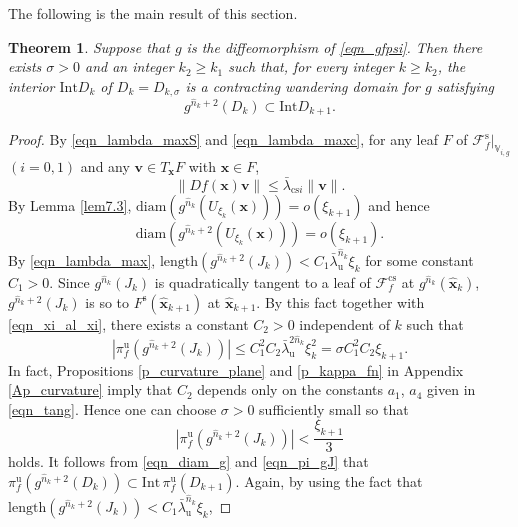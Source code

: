 \documentclass{amsart}
\newtheorem{thm}{Theorem}[section]
\theoremstyle{definition}
\numberwithin{equation}{section}
\numberwithin{figure}{section}
\begin{document}
The following is the main result of this section.


\begin{thm}\label{thmWD}
Suppose that $g$ is the diffeomorphism of \eqref{eqn_gfpsi}.
Then there exists $\sigma>0$ and an integer $k_2\geq k_1$ such that, 
for every integer $k\geq k_2$, the interior $\mathrm{Int}D_k$ of 
$D_k=D_{k,\sigma}$ is a 
contracting wandering domain for $g$ 
satisfying
\[
g^{\widehat n_{k}+2}(D_{k})\subset \mathrm{Int}D_{k+1}.
\]
\end{thm}
\begin{proof}
By \eqref{eqn_lambda_maxS} and \eqref{eqn_lambda_maxc}, for any leaf $F$ of $\mathcal{F}_f^{\mathrm{s}}|_{\mathbb{V}_{i,g}}$ $(i=0,1)$ and 
any $\boldsymbol{v}\in T_{\boldsymbol{x}}F$ with $\boldsymbol{x}\in F$,
$$\|Df(\boldsymbol{x})\boldsymbol{v}\|\leq \bar\lambda_{\mathrm{cs} i}\|\boldsymbol{v}\|.$$
By Lemma \ref{lem7.3}, $\mathrm{diam}(g^{\widehat n_k}(U_{\xi_k}(\boldsymbol{x})))=o(\xi_{k+1})$ and hence
\begin{equation}\label{eqn_diam_g}
\mathrm{diam}(g^{\widehat n_k+2}(U_{\xi_k}(\boldsymbol{x})))=o(\xi_{k+1}).
\end{equation}
By \eqref{eqn_lambda_max}, 
$\mathrm{length}(g^{\widehat n_k+2}(J_k))<C_1\bar\lambda_{\mathrm{u}}^{\widehat n_k}\xi_k$ for some constant $C_1>0$.
Since $g^{\widehat n_k}(J_k)$ is quadratically tangent to a leaf of $\mathcal{F}_f^{\mathrm{cs}}$ at $g^{\widehat n_k}(\widehat{ \boldsymbol{x}}_k)$, 
$g^{\widehat n_k+2}(J_k)$ is so to $F^{\mathrm{s}}(\widehat{\boldsymbol{x}}_{k+1})$ at $\widehat{\boldsymbol{x}}_{k+1}$.
By this fact 
together with \eqref{eqn_xi_al_xi}, there exists a constant $C_2>0$ independent of $k$ such that
$$|\pi_f^{\mathrm{u}}(g^{\widehat n_k+2}(J_k))|\leq C_1^2C_2\bar\lambda_{\mathrm{u}}^{2\widehat n_k}\xi_k^2=\sigma C_1^2C_2\xi_{k+1}.$$
In fact, Propositions \ref{p_curvature_plane} and \ref{p_kappa_fn} 
in Appendix \ref{Ap_curvature} imply that $C_2$ depends only on the constants $a_1$, $a_4$ given in \eqref{eqn_tang}.
Hence one can choose $\sigma>0$ sufficiently small so that  
\begin{equation}\label{eqn_pi_gJ}
|\pi_f^{\mathrm{u}}(g^{\widehat n_k+2}(J_k))|<\frac{\xi_{k+1}}3
\end{equation}
holds.
It follows from \eqref{eqn_diam_g} and \eqref{eqn_pi_gJ} that
$\pi_f^{\mathrm{u}}(g^{\widehat n_k+2}(D_k))\subset \mathrm{Int}\, \pi_f^{\mathrm{u}}(D_{k+1})$.
Again, by using the fact that $\mathrm{length}(g^{\widehat n_k+2}(J_k))<C_1\bar\lambda_{\mathrm{u}}^{\widehat n_k}\xi_k$, 

\end{proof}
\end{document}
